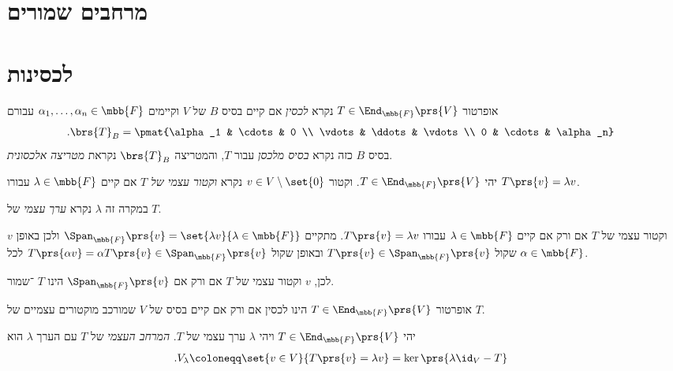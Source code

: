 \documentclass[a4paper,10pt,twoside,openany]{book}
\begin{document}
\section{מרחבים שמורים}


\section{לכסינות}

\begin{definition}
אופרטור
$T \in \End_{\mbb{F}}\prs{V}$
נקרא
\emph{לכסין}
אם קיים בסיס
$B$
של
$V$
וקיימים
$\alpha_1, \ldots, \alpha_n \in \mbb{F}$
עבורם
\begin{align*}
\text{.} \brs{T}_B &= \pmat{\alpha_1 & \cdots & 0 \\ \vdots & \ddots & \vdots \\ 0 & \cdots & \alpha_n}
\end{align*}
בסיס
$B$
כזה נקרא
\emph{בסיס מלכסן}
עבור
$T$,
והמטריצה
$\brs{T}_B$
נקראת
\emph{מטריצה אלכסונית}.
\end{definition}

\begin{definition}
יהי
$T \in \End_{\mbb{F}}\prs{V}$.
וקטור
$v \in V \setminus \set{0}$
נקרא
\emph{וקטור עצמי של
$T$}
אם קיים
$\lambda \in \mbb{F}$
עבורו
$T\prs{v} = \lambda v$.

במקרה זה
$\lambda$
נקרא
\emph{ערך עצמי}
של
$T$.
\end{definition}

\begin{remark}
$v$
וקטור עצמי של
$T$
אם ורק אם קיים
$\lambda \in \mbb{F}$
עבורו
$T\prs{v} = \lambda v$.
מתקיים
$\Span_{\mbb{F}}\prs{v} = \set{\lambda v}{\lambda \in \mbb{F}}$
ולכן באופן שקול
$T\prs{v} \in \Span_{\mbb{F}}\prs{v}$
ובאופן שקול
$T\prs{\alpha v} = \alpha T\prs{v} \in \Span_{\mbb{F}}\prs{v}$
לכל
$\alpha \in \mbb{F}$.

לכן,
$v$
וקטור עצמי של
$T$
אם ורק אם
$\Span_{\mbb{F}}\prs{v}$
הינו
$T$%
־שמור.
\end{remark}

\begin{remark}
אופרטור
$T \in \End_{\mbb{F}}\prs{V}$
הינו לכסין אם ורק אם קיים בסיס של
$V$
שמורכב מוקטורים עצמיים של
$T$.
\end{remark}

\begin{definition}
יהי
$T \in \End_{\mbb{F}}\prs{V}$
ויהי
$\lambda$
ערך עצמי של
$T$.
\emph{המרחב העצמי}
של
$T$
עם הערך
$\lambda$
הוא
\begin{align*}
\text{.} V_{\lambda} &\coloneqq \set{v \in V}{T\prs{v} = \lambda v} = \ker\prs{\lambda \id_V - T}
\end{align*}
\end{definition}
\end{document}
